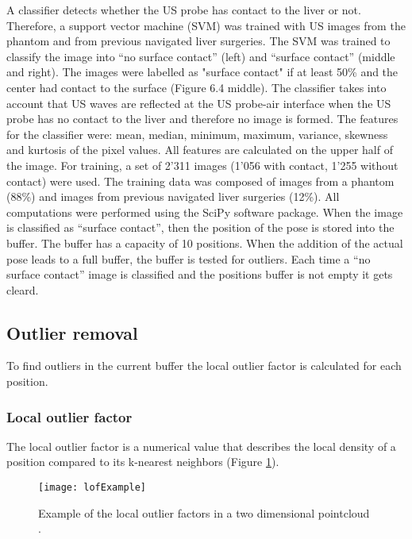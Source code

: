 A classifier detects whether the US probe has contact to the liver or not. Therefore, a support vector machine (SVM) was trained with US images
from the phantom and from previous navigated liver surgeries. The SVM was trained to
classify the image into ``no surface contact'' (left) and ``surface contact'' (middle and right).
The images were labelled as "surface contact" if at least 50\% and the center had contact
to the surface (Figure 6.4 middle). The classifier takes into account that US waves are
reflected at the US probe-air interface when the US probe has no contact to the liver and
therefore no image is formed. The features for the classifier were: mean, median, minimum,
maximum, variance, skewness and kurtosis of the pixel values. All features are calculated
on the upper half of the image. For training, a set of 2'311 images (1'056 with contact, 1'255
without contact) were used. The training data was composed of images from a phantom
(88\%) and images from previous navigated liver surgeries (12\%). All computations were
performed using the SciPy software package. When the image is classified as ``surface contact'', then the position of the pose is stored
into the buffer. The buffer has a capacity of 10 positions. When
the addition of the actual pose leads to a full buffer, the buffer is
tested for outliers.
Each time a ``no surface contact'' image is classified and the positions buffer
is not empty it gets cleard.
\subsection{Outlier removal}
To find outliers in the current buffer the local
outlier factor is calculated for each position. 

\subsubsection{Local outlier factor}
The local outlier factor is a numerical value that describes the local density
of a position compared to its k-nearest neighbors (Figure
\ref{fig:lofExample}).

\begin{figure}[H]
  \centering
 \texttt{[image: lofExample]}
  \caption{Example of the local outlier factors in a two dimensional pointcloud \cite{pictureLOF}.}
  \label{fig:lofExample}
\end{figure}


